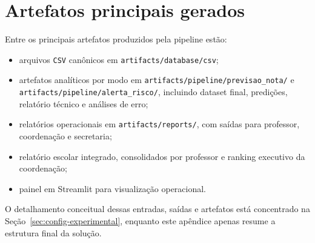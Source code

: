 \section{Artefatos principais gerados}

Entre os principais artefatos produzidos pela pipeline est\~ao:

\begin{itemize}
    \item arquivos \texttt{CSV} can\^onicos em \texttt{artifacts/database/csv};
    \item artefatos anal\'iticos por modo em \texttt{artifacts/pipeline/previsao\_nota/} e \texttt{artifacts/pipeline/alerta\_risco/}, incluindo dataset final, predi\c{c}\~oes, relat\'orio t\'ecnico e an\'alises de erro;
    \item relat\'orios operacionais em \texttt{artifacts/reports/}, com sa\'idas para professor, coordena\c{c}\~ao e secretaria;
    \item relat\'orio escolar integrado, consolidados por professor e ranking executivo da coordena\c{c}\~ao;
    \item painel em Streamlit para visualiza\c{c}\~ao operacional.
\end{itemize}

O detalhamento conceitual dessas entradas, sa\'idas e artefatos est\'a concentrado na Se\c{c}\~ao~\ref{sec:config-experimental}, enquanto este ap\^endice apenas resume a estrutura final da solu\c{c}\~ao.

